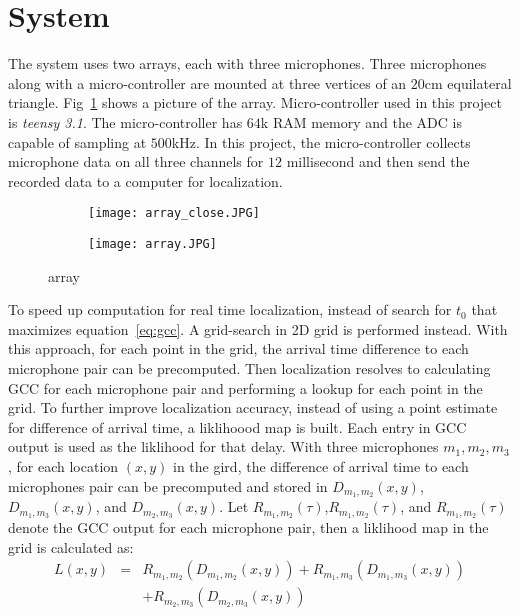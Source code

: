 \section{System}
The system uses two arrays, each with three microphones. Three microphones along with a micro-controller are mounted at three vertices of an $20$cm equilateral triangle. Fig~\ref{fig:setup_array} shows a picture of the array. Micro-controller used in this project is \emph{teensy 3.1}. The micro-controller has $64$k RAM memory and the ADC is capable of sampling at $500$kHz. In this project, the micro-controller collects microphone data on all three channels for $12$ millisecond and then send the recorded data to a computer for localization. 

\begin{figure}[]
  \centering
  \begin{subfigure}[]{.2\textwidth}
    \texttt{[image: array\_close.JPG]}
  \end{subfigure}
  \begin{subfigure}[]{.2\textwidth}
    \texttt{[image: array.JPG]}
  \end{subfigure}
  \caption{array}
  \label{fig:setup_array}
\end{figure}

To speed up computation for real time localization, instead of search for $t_0$ that maximizes equation~\ref{eq:gcc}. A grid-search in 2D grid is performed instead. With this approach, for each point in the grid, the arrival time difference to each microphone pair can be precomputed. Then localization resolves to calculating GCC for each microphone pair and performing a lookup for each point in the grid. To further improve localization accuracy, instead of using a point estimate for difference of arrival time, a liklihoood map is built. Each entry in GCC output is used as the liklihood for that delay. With three microphones $m_1,m_2,m_3$, for each location $(x,y)$ in the gird, the difference of arrival time to each microphones pair can be precomputed and stored in $D_{m_1,m_2}(x,y)$, $D_{m_1,m_3}(x,y)$, and $D_{m_2,m_3}(x,y)$. Let $R_{m_1,m_2}(\tau)$,$R_{m_1,m_2}(\tau)$, and $R_{m_1,m_2}(\tau)$ denote the GCC output for each microphone pair, then a liklihood map in the grid is calculated as:
\begin{eqnarray*}
  L(x,y) &=& R_{m_1,m_2}(D_{m_1,m_2}(x,y)) + R_{m_1,m_3}(D_{m_1,m_3}(x,y)) \\
 & & +R_{m_2,m_3}(D_{m_2,m_3}(x,y)) 
\end{eqnarray*}

